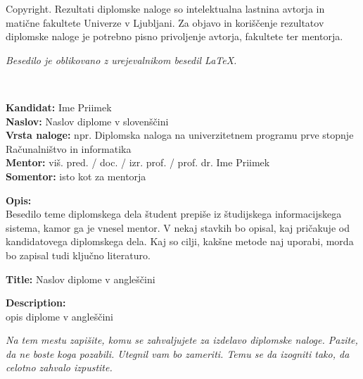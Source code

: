 \documentclass[a4paper, 12pt]{book}
\newcommand{\clearemptydoublepage}{\newpage{\pagestyle{empty}\cleardoublepage}}
\theoremstyle{definition}
\begin{document}
\thispagestyle{empty}
\vspace*{8cm}

\noindent
{\sc Copyright}. 
Rezultati diplomske naloge so intelektualna lastnina avtorja in matične fakultete Univerze v Ljubljani.
Za objavo in koriščenje rezultatov diplomske naloge je potrebno pisno privoljenje avtorja, fakultete ter mentorja.

\begin{center}
\mbox{}\vfill
\emph{Besedilo je oblikovano z urejevalnikom besedil \LaTeX.}
\end{center}
\clearemptydoublepage

\thispagestyle{empty}
\
\vfill

\bigskip
\noindent\textbf{Kandidat:} Ime Priimek\\
\noindent\textbf{Naslov:} Naslov diplome v slovenščini\\
\noindent\textbf{Vrsta naloge:} npr. Diplomska naloga na univerzitetnem programu prve stopnje Računalništvo in informatika \\
\noindent\textbf{Mentor:} viš. pred. / doc. / izr. prof. / prof. dr. Ime Priimek\\
\noindent\textbf{Somentor:} isto kot za mentorja

\bigskip
\noindent\textbf{Opis:}\\
Besedilo teme diplomskega dela študent prepiše iz študijskega informacijskega sistema, kamor ga je vnesel mentor. 
V nekaj stavkih bo opisal, kaj pričakuje od kandidatovega diplomskega dela. 
Kaj so cilji, kakšne metode naj uporabi, morda bo zapisal tudi ključno literaturo.

\bigskip
\noindent\textbf{Title:} Naslov diplome v angleščini

\bigskip
\noindent\textbf{Description:}\\
opis diplome v angleščini

\vfill



\vspace{2cm}

\clearemptydoublepage

\thispagestyle{empty}\mbox{}\vfill\null\it%
\noindent
Na tem mestu zapišite, komu se zahvaljujete za izdelavo diplomske naloge. Pazite, da ne boste koga pozabili. Utegnil vam bo zameriti. Temu se da izogniti tako, da celotno zahvalo izpustite.
\rm\normalfont
\end{document}
